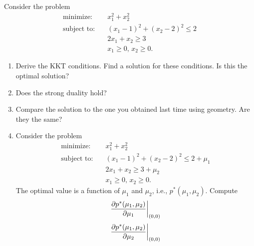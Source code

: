 \documentclass[11pt]{article}
\begin{document}
\makeAssignmentTitle

\begin{homeworkProblem}
    Consider the problem
    \begin{align*}
        \text{minimize:} \quad   & x_1^2 + x_2^2                    \\
        \text{subject to:} \quad & (x_1 - 1)^2 + (x_2 - 2)^2 \leq 2 \\
                                 & 2x_1 + x_2 \geq 3                \\
                                 & x_1 \geq 0, \, x_2 \geq 0.
    \end{align*}
    \begin{enumerate}[label=(\alph*), topsep=5pt, itemsep=5pt]
        \item Derive the KKT conditions. Find a solution for these conditions. Is this the optimal solution?
        \item Does the strong duality hold?
        \item Compare the solution to the one you obtained last time using geometry. Are they the same?
        \item Consider the problem
              \begin{align*}
                  \text{minimize:} \quad   & x_1^2 + x_2^2                            \\
                  \text{subject to:} \quad & (x_1 - 1)^2 + (x_2 - 2)^2 \leq 2 + \mu_1 \\
                                           & 2x_1 + x_2 \geq 3 + \mu_2                \\
                                           & x_1 \geq 0, \, x_2 \geq 0.
              \end{align*}
              The optimal value is a function of $\mu_1$ and $\mu_2$, i.e., $p^*(\mu_1, \mu_2)$. Compute
              \[
                  \frac{\partial p^*(\mu_1, \mu_2)}{\partial \mu_1} \bigg{|}_{(0, 0)}
              \]
              \[
                  \frac{\partial p^*(\mu_1, \mu_2)}{\partial \mu_2} \bigg{|}_{(0, 0)}
              \] \newline
    \end{enumerate}

    \solution


\end{homeworkProblem}
\end{document}
